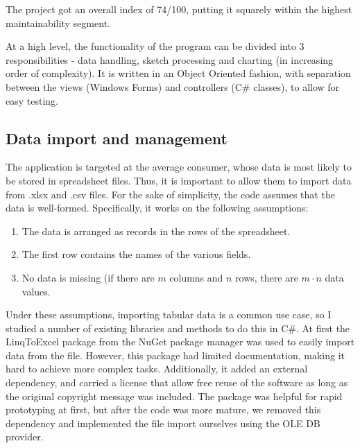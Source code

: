 	The project got an overall index of 74/100, putting it squarely within the highest maintainability segment.
	
	At a high level, the functionality of the program can be divided into 3 responsibilities - data handling, sketch processing and charting (in increasing order of complexity). It is written in an Object Oriented fashion, with separation between the views (Windows Forms) and controllers (C\# classes), to allow for easy testing.
	
	
	\subsection{Data import and management}
	The application is targeted at the average consumer, whose data is most likely to be stored in spreadsheet files. Thus, it is important to allow them to import data from .xlsx and .csv files. 
		For the sake of simplicity, the code assumes that the data is well-formed. Specifically, it works on the following assumptions:
		\begin{enumerate}
		\item The data is arranged as records in the rows of the spreadsheet.
		\item The first row contains the names of the various fields.
		\item No data is missing (if there are $m$ columns and $n$ rows, there are $m \cdot n$ data values.
		\end{enumerate}
		
		Under these assumptions, importing tabular data is a common use case, so I studied a number of existing libraries and methods to do this in C\#. At first the LinqToExcel package from the NuGet package manager was used to easily import data from the file. However, this package had limited documentation, making it hard to achieve more complex tasks. Additionally, it added an external dependency, and carried a license that allow free reuse of the software as long as the original copyright message was included. The package was helpful for rapid prototyping at first, but after the code was more mature, we removed this dependency and implemented the file import ourselves using the OLE DB provider.
	
